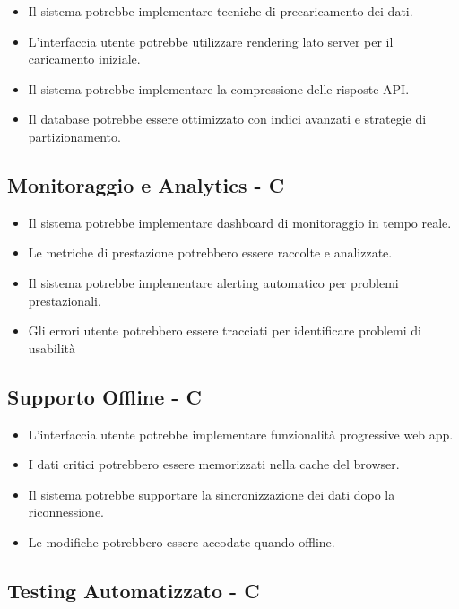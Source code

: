 \documentclass[12pt,a4paper,oneside]{report}
\begin{document}
\begin{itemize}
    \item Il sistema potrebbe implementare tecniche di precaricamento dei dati.
    \item L'interfaccia utente potrebbe utilizzare rendering lato server per il caricamento iniziale.
    \item Il sistema potrebbe implementare la compressione delle risposte API.
    \item Il database potrebbe essere ottimizzato con indici avanzati e strategie di partizionamento.
\end{itemize}

\subsection{Monitoraggio e Analytics - C}

\begin{itemize}
    \item Il sistema potrebbe implementare dashboard di monitoraggio in tempo reale.
    \item Le metriche di prestazione potrebbero essere raccolte e analizzate.
    \item Il sistema potrebbe implementare alerting automatico per problemi prestazionali.
    \item Gli errori utente potrebbero essere tracciati per identificare problemi di usabilità
\end{itemize}

\subsection{Supporto Offline - C}

\begin{itemize}
    \item L'interfaccia utente potrebbe implementare funzionalità progressive web app.
    \item I dati critici potrebbero essere memorizzati nella cache del browser.
    \item Il sistema potrebbe supportare la sincronizzazione dei dati dopo la riconnessione.
    \item Le modifiche potrebbero essere accodate quando offline.
\end{itemize}

\subsection{Testing Automatizzato - C}
\end{document}
